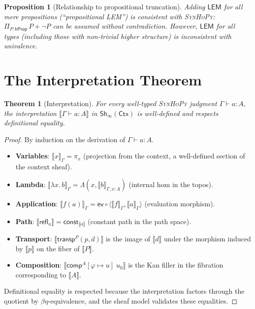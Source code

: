 \documentclass[11pt,a4paper]{report}
\theoremstyle{definition}
\theoremstyle{plain}
\newtheorem{theorem}[definition]{Theorem}
\newtheorem{proposition}[definition]{Proposition}
\newcommand{\den}[1]{\llbracket #1 \rrbracket}
\newcommand{\transp}{\mathsf{transp}}
\newcommand{\comp}{\mathsf{comp}}
\newcommand{\Refl}{\mathsf{refl}}
\newcommand{\Ctx}{\mathsf{Ctx}}
\newcommand{\synhopy}{\textsc{SynHoPy}}
\newcommand{\Sh}{\mathsf{Sh}}
\begin{document}
\begin{proposition}[Relationship to propositional truncation]
\label{prop:lem-truncation}
Adding $\mathsf{LEM}$ for all mere propositions (``propositional LEM'') is
consistent with \synhopy{}: $\Pi_{P : \mathsf{hProp}}\, P + \neg P$ can be
assumed without contradiction.  However, $\mathsf{LEM}$ for all types
(including those with non-trivial higher structure) is inconsistent with
univalence.
\end{proposition}


\section{The Interpretation Theorem}

\begin{theorem}[Interpretation]
\label{thm:interpretation}
For every well-typed \synhopy{} judgment $\Gamma \vdash a : A$, the
interpretation $\den{\Gamma \vdash a : A}$ in $\Sh_\infty(\Ctx)$ is
well-defined and respects definitional equality.
\end{theorem}
\begin{proof}
By induction on the derivation of $\Gamma \vdash a : A$.
\begin{itemize}
  \item \textbf{Variables}: $\den{x}_{\Gamma} = \pi_x$ (projection from the
    context, a well-defined section of the context sheaf).
  \item \textbf{Lambda}: $\den{\lambda x.\, b}_\Gamma = \Lambda(x, \den{b}_{\Gamma,x:A})$
    (internal hom in the topos).
  \item \textbf{Application}: $\den{f(a)}_\Gamma = \mathsf{ev} \circ
    \langle \den{f}_\Gamma, \den{a}_\Gamma \rangle$ (evaluation morphism).
  \item \textbf{Path}: $\den{\Refl_a} = \mathsf{const}_{\den{a}}$ (constant path
    in the path space).
  \item \textbf{Transport}: $\den{\transp^P(p, d)}$ is the image of $\den{d}$
    under the morphism induced by $\den{p}$ on the fiber of $\den{P}$.
  \item \textbf{Composition}: $\den{\comp^A[\varphi \mapsto u]\;u_0}$ is the
    Kan filler in the fibration corresponding to $\den{A}$.
\end{itemize}
Definitional equality is respected because the interpretation factors through
the quotient by $\beta\eta$-equivalence, and the sheaf model validates these
equalities.
\end{proof}
\end{document}
